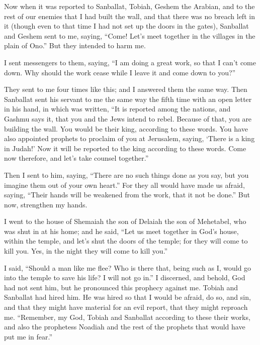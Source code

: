 \mychapter{} \myverse*{}Now when it was reported to Sanballat, Tobiah, Geshem the Arabian,
and to the rest of our enemies that I had built the wall, and that there was no breach left in it (though
even to that time I had not set up the doors in the gates),
\myverse{}Sanballat and Geshem sent to me, saying, “Come! Let’s meet together in the villages
in the plain of Ono.” But they intended to harm me.

\myverse{}I sent messengers to them, saying, “I am doing a great work, so
that I can’t come down. Why should the work cease while I leave it and come down to you?”

\myverse{}They sent to me four times like this; and I answered them the same
way.
\myverse{}Then Sanballat sent his servant to me the same way the fifth time with an open
letter in his hand,
\myverse{}in which was written, “It is reported among the nations, and Gashmu says it,
that you and the Jews intend to rebel. Because of that, you are building the wall. You would be their
king, according to these words.
\myverse{}You have also appointed prophets to proclaim of you at Jerusalem, saying, ‘There
is a king in Judah!’ Now it will be reported to the king according to these words. Come now therefore,
and let’s take counsel together.”

\myverse{}Then I sent to him, saying, “There are no such things done as you
say, but you imagine them out of your own heart.”
\myverse{}For they all would have made us afraid, saying, “Their hands will be weakened
from the work, that it not be done.” But now, strengthen my hands.

\myverse{}I went to the house of Shemaiah the son of Delaiah the son of
Mehetabel, who was shut in at his home; and he said, “Let us meet together in God’s house, within the
temple, and let’s shut the doors of the temple; for they will come to kill you. Yes, in the night they
will come to kill you.”

\myverse{}I said, “Should a man like me flee? Who is there that, being
such as I, would go into the temple to save his life? I will not go in.”
\myverse{}I discerned, and behold, God had not sent him, but he pronounced this prophecy
against me. Tobiah and Sanballat had hired him.
\myverse{}He was hired so that I would be afraid, do so, and sin, and that they might
have material for an evil report, that they might reproach me.
\myverse{}“Remember, my God, Tobiah and Sanballat according to these their works, and
also the prophetess Noadiah and the rest of the prophets that would have put me in fear.”

